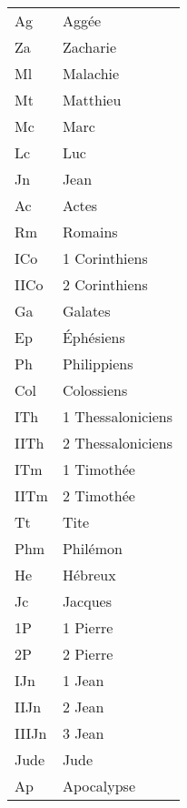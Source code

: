 \begin{longtable}{ll}
Ag	&	Aggée\\
Za	&	Zacharie\\
Ml	&	Malachie\\
Mt	&	Matthieu\\
Mc	&	Marc\\
Lc	&	Luc\\
Jn	&	Jean\\
Ac	&	Actes\\
Rm	&	Romains\\
ICo	&	1 Corinthiens\\
IICo	&	2 Corinthiens\\
Ga	&	Galates\\
Ep	&	Éphésiens\\
Ph	&	Philippiens\\
Col	&	Colossiens\\
ITh	&	1 Thessaloniciens\\
IITh	&	2 Thessaloniciens\\
ITm	&	1 Timothée\\
IITm	&	2 Timothée\\
Tt	&	Tite\\
Phm	&	Philémon\\
He	&	Hébreux\\
Jc	&	Jacques\\
1P	&	1 Pierre\\
2P	&	2 Pierre\\
IJn	&	1 Jean\\
IIJn	&	2 Jean\\
IIIJn	&	3 Jean\\
Jude	&	Jude\\
Ap	&	Apocalypse\\
\end{longtable}